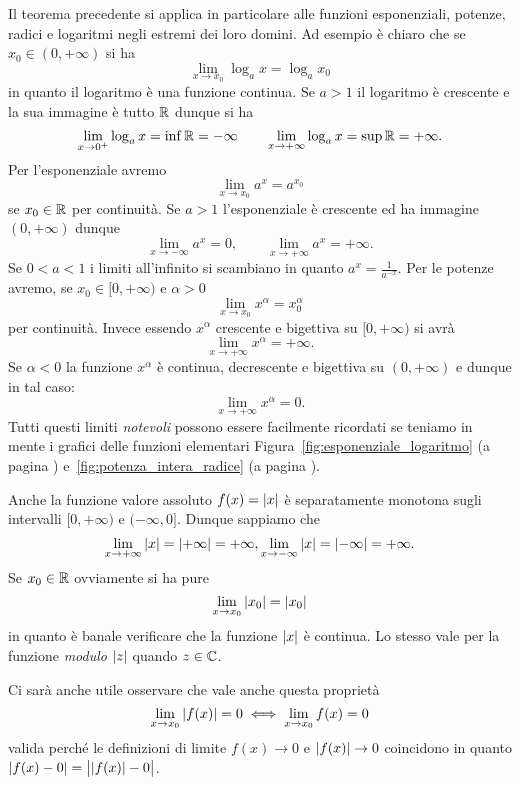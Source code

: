 Il teorema precedente si applica in particolare alle funzioni 
esponenziali, potenze, radici e logaritmi negli estremi dei loro 
domini. Ad esempio è chiaro che se $x_0\in (0,+\infty)$ 
si ha 
\[
  \lim_{x\to x_0} \log_a x = \log_a x_0
\]
in quanto il logaritmo è una funzione continua. 
Se $a>1$ il logaritmo è crescente e la sua immagine è tutto ${\mathbb R}$ 
dunque si ha 
\[
  \lim_{x\to 0^+} \log_a x = \inf {\mathbb R} = -\infty
  \qquad
  \lim_{x\to +\infty} \log_a x = \sup {\mathbb R} = +\infty.
\]
Per l'esponenziale avremo 
\[
 \lim_{x\to x_0} a^x = a^{x_0}
\]
se $x_0\in {\mathbb R}$ per continuità. 
Se $a>1$ l'esponenziale è crescente 
ed ha immagine $(0,+\infty)$ dunque 
\[
  \lim_{x\to -\infty} a^x = 0, \qquad 
  \lim_{x\to +\infty} a^x = +\infty.
\]
Se $0<a<1$ i limiti all'infinito 
si scambiano in quanto $a^{x}= \frac{1}{a^{-x}}$.
Per le potenze avremo, se $x_0\in[0,+\infty)$ e $\alpha>0$
\[
  \lim_{x\to x_0} x^\alpha = x_0^\alpha
\]
per continuità. Invece essendo $x^\alpha$ crescente e bigettiva 
su $[0,+\infty)$ si avrà 
\[
  \lim_{x\to +\infty} x^\alpha = +\infty.
\]
Se $\alpha<0$ la funzione $x^\alpha$ è continua, decrescente e bigettiva 
su $(0,+\infty)$ e dunque in tal caso:
\[
  \lim_{x\to +\infty} x^\alpha = 0.
\]
Tutti questi limiti \emph{notevoli} possono essere facilmente 
ricordati se teniamo in mente i grafici delle funzioni elementari
Figura~\ref{fig:esponenziale_logaritmo} (a pagina \pageref{fig:esponenziale_logaritmo})
e~\ref{fig:potenza_intera_radice} (a pagina \pageref{fig:potenza_intera_radice}).

Anche la funzione valore assoluto $f(x)={\left|x\right|}$ è separatamente 
monotona sugli intervalli $[0,+\infty)$ e $(-\infty,0]$. 
Dunque sappiamo che 
\[
  \lim_{x\to +\infty} {\left|x\right|} = {\left|+\infty\right|} = +\infty, 
  \lim_{x\to -\infty} {\left|x\right|} = {\left|-\infty\right|} = +\infty.
\]
Se $x_0\in {\mathbb R}$ ovviamente si ha pure
\[
  \lim_{x\to x_0} {\left|x_0\right|} = {\left|x_0\right|}
\]
in quanto è banale verificare che la funzione ${\left|x\right|}$ è continua.
Lo stesso vale per la funzione \emph{modulo} ${\left|z\right|}$ quando $z\in {\mathbb C}$.

Ci sarà anche utile osservare che vale anche questa proprietà 
\[
\lim_{x\to x_0} {\left|f(x)\right|} = 0 \iff 
\lim_{x\to x_0} f(x) = 0
\]
valida perché le definizioni di limite $f(x)\to 0$ e ${\left|f(x)\right|}\to 0$ 
coincidono in quanto ${\left|f(x)-0\right|} = \big\lvert{{\left|f(x)\right|} - 0}\big\rvert$.

